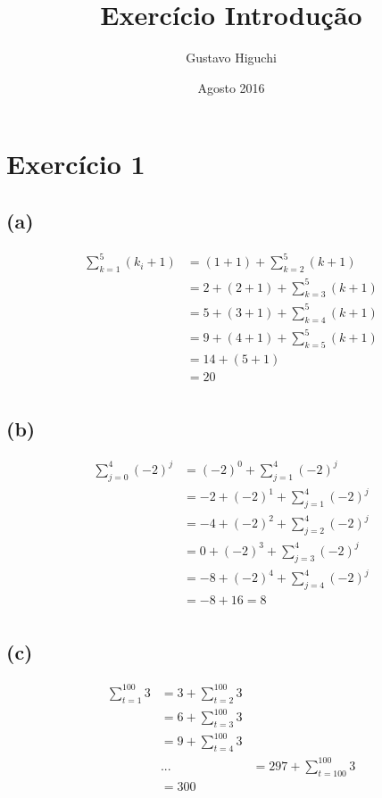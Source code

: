 \documentclass{article}
\title{Exercício Introdução}
\author{Gustavo Higuchi}
\date{Agosto 2016}
\begin{document}
\maketitle
\section{Exercício 1}
\subsection*{(a)}

\begin{equation} \label{eq1}
\begin{split}
\sum\limits_{k=1}^{5}(k_i + 1) & =  (1 + 1) + \sum\limits_{k=2}^{5}(k + 1) \\
& =  2 + (2 + 1) + \sum\limits_{k=3}^{5}(k + 1) \\
& =  5 + (3 + 1) + \sum\limits_{k=4}^{5}(k + 1) \\
& =  9 + (4 + 1) + \sum\limits_{k=5}^{5}(k + 1) \\
& =  14 + (5 + 1)  \\
& =  20  \\
\end{split}
\end{equation}

\subsection*{(b)}
\begin{equation} \label{eq2}
\begin{split}
\sum\limits_{j=0}^{4}(-2)^j & =  (-2)^0 + \sum\limits_{j=1}^{4}(-2)^j \\
& =  -2 + (-2)^1 + \sum\limits_{j=1}^{4}(-2)^j \\
& =  -4 + (-2)^2 + \sum\limits_{j=2}^{4}(-2)^j \\
& =  0 + (-2)^3 + \sum\limits_{j=3}^{4}(-2)^j \\
& =  -8 + (-2)^4 + \sum\limits_{j=4}^{4}(-2)^j \\
& = -8 + 16 = 8\\
\end{split}
\end{equation}

\subsection*{(c)}
\begin{equation} \label{eq3}
\begin{split}
\sum\limits_{t=1}^{100}3 & =  3 + \sum\limits_{t=2}^{100}3 \\
& = 6 + \sum\limits_{t=3}^{100}3 \\
& = 9 + \sum\limits_{t=4}^{100}3 \\
& ...
& = 297 + \sum\limits_{t=100}^{100}3 \\
& = 300 \\
\end{split}
\end{equation}
\end{document}
